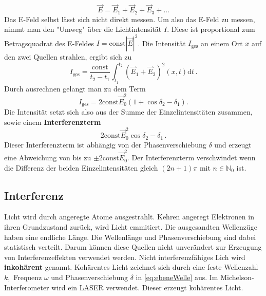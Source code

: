 \begin{equation*}
    \vec{E} = \vec{E}_1 + \vec{E}_2 + \vec{E}_3 + ...
\end{equation*}
Das E-Feld selbst lässt sich nicht direkt messen.
Um also das E-Feld zu messen, nimmt man den "Umweg" über die Lichtintensität $I$.
Diese ist proportional zum Betragsquadrat des E-Feldes $I = \text{const} |\vec{E}|^2$.
Die Intensität $I_{\text{ges}}$ an einem Ort $x$ auf den zwei Quellen strahlen,
ergibt sich zu 
\begin{equation*}
    I_{\text{ges}} = \frac{\text{const}}{t_2 - t_1} \int_{t_1}^{t_2} \left( \vec{E}_1 + \vec{E}_2 \right)^2 \left(x,t\right) \text{d}t\, .
\end{equation*}
Durch ausrechnen gelangt man zu dem Term
\begin{equation*}
    I_{\text{ges}} = 2\text{const}\vec{E}_0^2\left(1 + \cos{δ_2-δ_1}\right).
\end{equation*}
Die Intensität setzt sich also aus der Summe der Einzelintensitäten zusammen,
sowie einem \textbf{Interferenzterm}
\begin{equation*}
    2\text{const}\vec{E}_0^2\cos{δ_2-δ_1}\, .
\end{equation*}
Dieser Interferenzterm ist abhängig von der Phasenverschiebung $δ$ und erzeugt eine Abweichung von bis zu $\pm 2\text{const}\vec{E}_0^2.$ 
Der Interferenzterm verschwindet wenn die Differenz der beiden Einzelintensitäten gleich $(2n + 1)π$ mit $n \in \mathbb{N}_0$ ist.

\subsection{Interferenz}
\label{sec:Interferenz}

Licht wird durch angeregte Atome ausgestrahlt. 
Kehren angeregt Elektronen in ihren Grundzustand zurück, wird Licht emmitiert.
Die ausgesandten Wellenzüge haben eine endliche Länge.
Die Wellenlänge und Phasenverschiebung sind dabei statistisch verteilt.
Darum können diese Quellen nicht unverändert zur Erzeugung von Interferenzeffekten verwendet werden.
Nicht interferenzfähiges Lich wird \textbf{inkohärent} genannt.
Kohärentes Licht zeichnet sich durch eine feste Wellenzahl $k,$ Frequenz $ω$ und Phasenverschiebung $δ$ in \autoref{eq:ebeneWelle} aus.
Im Michelson-Interferometer wird ein LASER verwendet.
Dieser erzeugt kohärentes Licht.

